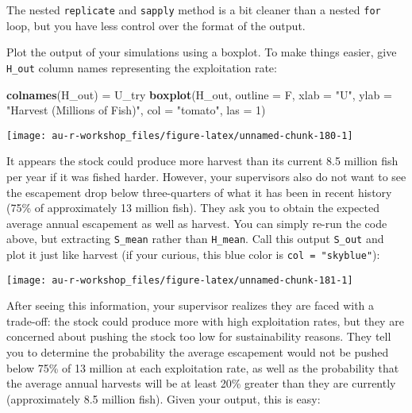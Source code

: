 \documentclass[]{book}
\newenvironment{Shaded}{\begin{snugshade}}{\end{snugshade}}
\newcommand{\KeywordTok}[1]{\textcolor[rgb]{0.13,0.29,0.53}{\textbf{#1}}}
\newcommand{\DataTypeTok}[1]{\textcolor[rgb]{0.13,0.29,0.53}{#1}}
\newcommand{\DecValTok}[1]{\textcolor[rgb]{0.00,0.00,0.81}{#1}}
\newcommand{\StringTok}[1]{\textcolor[rgb]{0.31,0.60,0.02}{#1}}
\newcommand{\NormalTok}[1]{#1}
\theoremstyle{definition}
\theoremstyle{definition}
\theoremstyle{definition}
\theoremstyle{remark}
\begin{document}
The nested \texttt{replicate} and \texttt{sapply} method is a bit
cleaner than a nested \texttt{for} loop, but you have less control over
the format of the output.

Plot the output of your simulations using a boxplot. To make things
easier, give \texttt{H\_out} column names representing the exploitation
rate:

\begin{Shaded}
\begin{Highlighting}[]
\KeywordTok{colnames}\NormalTok{(H_out) =}\StringTok{ }\NormalTok{U_try}
\KeywordTok{boxplot}\NormalTok{(H_out, }\DataTypeTok{outline =}\NormalTok{ F,}
        \DataTypeTok{xlab =} \StringTok{"U"}\NormalTok{, }\DataTypeTok{ylab =} \StringTok{"Harvest (Millions of Fish)"}\NormalTok{,}
        \DataTypeTok{col =} \StringTok{"tomato"}\NormalTok{, }\DataTypeTok{las =} \DecValTok{1}\NormalTok{)}
\end{Highlighting}
\end{Shaded}

\begin{center}\texttt{[image: au-r-workshop\_files/figure-latex/unnamed-chunk-180-1]} \end{center}

It appears the stock could produce more harvest than its current 8.5
million fish per year if it was fished harder. However, your supervisors
also do not want to see the escapement drop below three-quarters of what
it has been in recent history (75\% of approximately 13 million fish).
They ask you to obtain the expected average annual escapement as well as
harvest. You can simply re-run the code above, but extracting
\texttt{S\_mean} rather than \texttt{H\_mean}. Call this output
\texttt{S\_out} and plot it just like harvest (if your curious, this
blue color is \texttt{col\ =\ "skyblue"}):

\begin{center}\texttt{[image: au-r-workshop\_files/figure-latex/unnamed-chunk-181-1]} \end{center}

After seeing this information, your supervisor realizes they are faced
with a trade-off: the stock could produce more with high exploitation
rates, but they are concerned about pushing the stock too low for
sustainability reasons. They tell you to determine the probability the
average escapement would not be pushed below 75\% of 13 million at each
exploitation rate, as well as the probability that the average annual
harvests will be at least 20\% greater than they are currently
(approximately 8.5 million fish). Given your output, this is easy:
\end{document}
